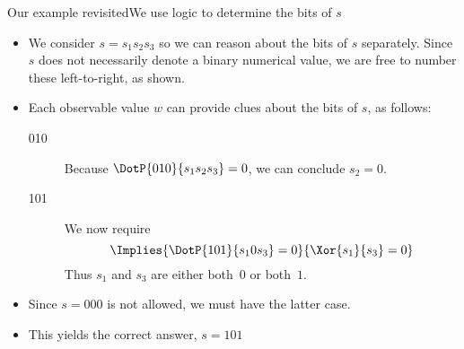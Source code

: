 \begin{frame}{Our example revisited}{We use logic to determine the bits of $s$}

\begin{itemize}
    \item We consider $s=s_{1}s_{2}s_{3}$ so we can reason about the bits of $s$ separately.  Since $s$ does not necessarily denote a binary numerical value, we are free to number these left-to-right, as shown.
    \item Each observable value $w$ can provide clues about the bits of $s$, as follows:
\begin{description}
   \item[010]  Because $\DotP{010}{s_{1}s_{2}s_{3}}=0$, we can conclude $s_{2}=0$.
   \item[101]  We now require \[
   \Implies{\DotP{101}{s_{1}0s_{3}}=0}{\Xor{s_1}{s_3}=0}\]
   Thus $s_1$ and $s_3$ are either both~$0$ or both~$1$.
\end{description}
   \item Since $s=000$ is not allowed, we must have the latter case.  
   \item This yields the correct answer, $s=101$
\end{itemize}

    
\end{frame}
